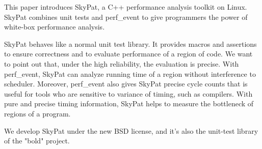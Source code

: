 This paper introduces SkyPat, a C++ performance analysis toolkit on Linux.
SkyPat combines unit tests and perf_event to give programmers the power of white-box performance analysis.

SkyPat behaves like a normal unit test library.
It provides macros and assertions to ensure correctness and to evaluate performance of a region of code.
We want to point out that, under the high reliability, the evaluation is precise.
With perf_event, SkyPat can analyze running time of a region without interference to scheduler. 
Moreover, perf_event also gives SkyPat precise cycle counts that is useful for tools who are sensitive to variance of timing, such as compilers.
With pure and precise timing information, SkyPat helps to measure the bottleneck of regions of a program.

We develop SkyPat under the new BSD license, and it's also the unit-test library of the "bold" project.
